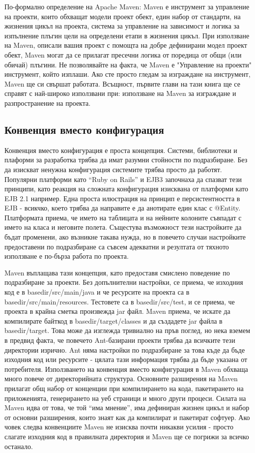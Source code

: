 По-формално определение на Apache Maven: Maven е инструмент за
управление на проекти, които обхващат модели проект обект, един набор
от стандарти, на жизнения цикъл на проекта, система за управление на
зависимост и логика за изпълнение плъгин цели на определени етапи в
жизнения цикъл. При използване на Maven, описали вашия проект с
помощта на добре дефинирани модел проект обект, Maven могат да се
прилагат пресечни логика от поредица от общи (или обичай) плъгини.  Не
позволявайте на факта, че Maven е "Управление на проекти" инструмент,
който изплаши. Ако сте просто гледам за изграждане на инструмент,
Maven ще си свършат работата. Всъщност, първите глави на тази книга ще
се справят с най-широко използвани при: използване на Maven за
изграждане и разпространение на проекта.
\subsection{Конвенция вместо конфигурация}
Конвенция вместо конфигурация е проста концепция. Системи, библиотеки
и плаформи за разработка  
трябва да имат разумни стойности по подразбиране. Без да изискват
ненужна конфигурация системите трябва просто да работят. Популярни
платформи като "`Ruby on Rails"' и EJB3 започнаха да спазват тези
принципи, като реакция на сложната конфигурация изисквана от платформи
като EJB 2.1 например. Една проста илюстрация на принцип е
персистентността в EJB - всикчко, което трябва да направите е да
анотирате един клас с @Entity. Платформата приема, че името на
таблицата и на нейните колоните съвпадат с името на класа и неговите
полета. Същестува възможност тези настройките да бъдат променени, ако
възникне такава нужда, но в повечето случаи настройките предоставени
по подразбиране са съвсем адекватни и резултата от тяхното използване
е по-бърза работа по проекта.

Maven въплащава тази концепция, като предоставя смислено поведение по
подразбиране за проекти. Без допълнителни настройки, се приема, че
изходния код е в basedir/src/main/java и че ресурсите на проекта са в 
basedir/src/main/resources. Тестовете са в basedir/src/test, и се
приема, че проекта в крайна сметка произвежда jar файл. Maven приема,
че искате да компилирате байткод в basedir/target/classes и да
създадете jar файла в basedir/target. Това може да изглежда тривиално
на пръв поглед, но нека вземем в предвид факта, че повечето
Ant-базирани проекти трябва да всичките тези директории изрично. Ant
няма настройки по подразбиране за това къде да бъде изходния код или
ресурсите - цялата тази информация трябва да бъде указана от
потребителя. Използването на конвенция вместо конфигурация в Maven
обхваща много повече от директорийната структура. Основните разширения
на Maven прилагат общ набор от конценции при компилирането на кода,
пакетирането на приложенията, генерирането на уеб страници и много
други процеси. Силата на Maven идва от това, че той "`има мнение"',
има дефиниран жизнен цикъл и набор от основни разширения, които знаят
как да компилират и пакетират софтуер. Ако човек следва конвенциите
Maven не изисква почти никакви усилия - просто слагате изходния код в
правилната директория и Maven ще се погрижи за всичко останало.

